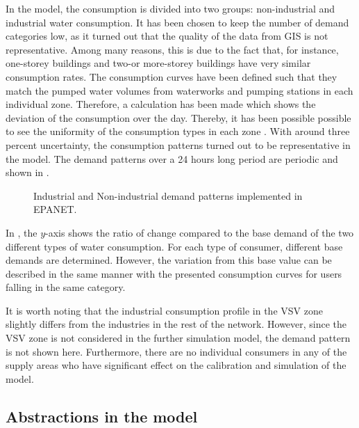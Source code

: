 In the model, the consumption is divided into two groups: non-industrial and industrial water consumption. It has been chosen to keep the number of demand categories low, as it turned out that the quality of the data from GIS is not representative. Among many reasons, this is due to the fact that, for instance, one-storey buildings and two-or more-storey buildings have very similar consumption rates. The consumption curves have been defined such that they match the pumped water volumes from waterworks and pumping stations in each individual zone. Therefore, a calculation has been made which shows the deviation of the consumption over the day. Thereby, it has been possible possible to see the uniformity of the consumption types in each zone \cite{verdo_doc}. With around three percent uncertainty, the consumption patterns turned out to be representative in the model. The demand patterns over a 24 hours long period are periodic and shown in  .

\begin{figure}[H]
\centering

\caption{Industrial and Non-industrial demand patterns implemented in EPANET.}
\label{fig:demandpatterns_EPANET}
\end{figure}

\vspace{-3mm}

In , the $y$-axis shows the ratio of change compared to the base demand of the two different types of water consumption. For each type of consumer, different base demands are determined. However, the variation from this base value can be described in the same manner with the presented consumption curves for users falling in the same category. 

It is worth noting that the industrial consumption profile in the VSV zone slightly differs from the industries in the rest of the network. However, since the VSV zone is not considered in the further simulation model, the demand pattern is not shown here. Furthermore, there are no individual consumers in any of the supply areas who have  significant effect on the calibration and simulation of the model. 

\subsection{Abstractions in the model}
\label{control_and_water_source_abstractions}

